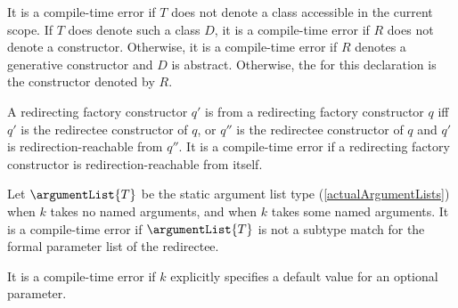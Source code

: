 \documentclass[makeidx]{article}
\begin{document}
\LMHash{}%
It is a compile-time error if $T$ does not denote
a class accessible in the current scope.
If $T$ does denote such a class $D$,
it is a compile-time error if $R$ does not denote a constructor.
Otherwise, it is a compile-time error
if $R$ denotes a generative constructor and $D$ is abstract.
Otherwise, the
for this declaration is the constructor denoted by $R$.

\LMHash{}%
A redirecting factory constructor $q'$ is 
from a redirecting factory constructor $q$ if{}f
$q'$ is the redirectee constructor of $q$,
or $q''$ is the redirectee constructor of $q$
and $q'$ is redirection-reachable from $q''$.
It is a compile-time error if a redirecting factory constructor
is redirection-reachable from itself.

\LMHash{}%
Let $\argumentList{T}$ be the static argument list type (\ref{actualArgumentLists})
when $k$ takes no named arguments, and
when $k$ takes some named arguments.
It is a compile-time error if $\argumentList{T}$
is not a subtype match for the formal parameter list of the redirectee.



\LMHash{}%
It is a compile-time error if $k$ explicitly specifies a default value for an optional parameter.

\end{document}
